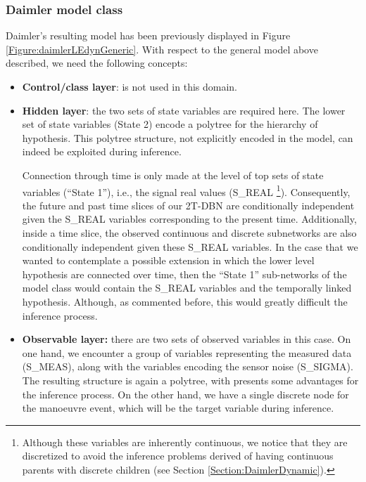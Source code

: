 
\subsubsection{Daimler model class}\label{daimlerAMIDSTModels}


Daimler's resulting model has been previously displayed in Figure \ref{Figure:daimlerLEdynGeneric}. With respect to the general model above described, we need the following concepts:

\begin{itemize}
\item \textbf{Control/class layer}: is not used in this domain.

\item \textbf{Hidden layer}: the two sets of state variables are required here. The lower set of state variables (State 2) encode a polytree \cite{JensenNielsen2007} for the hierarchy of hypothesis. This polytree structure, not explicitly encoded in the model, can indeed be exploited during inference.


Connection through time is only made at the level of top sets of state variables (``State 1''), i.e., the signal real values (S\_REAL \footnote{Although these variables are inherently continuous, we notice that they are discretized to avoid the inference problems derived of having continuous parents with discrete children (see Section \ref{Section:DaimlerDynamic}).}). Consequently, the future and past time slices of our 2T-DBN are conditionally independent given the S\_REAL variables corresponding to the present time. Additionally, inside a time slice, the observed continuous and discrete subnetworks are also conditionally independent given these S\_REAL variables. In the case that we wanted to contemplate a possible extension in which the lower level hypothesis are connected over time, then the ``State 1'' sub-networks of the model class would contain the S\_REAL variables and the temporally linked hypothesis. Although, as commented before, this would greatly difficult the inference process. 

\item \textbf{Observable layer:} there are two sets of observed variables in this case. On one hand, we encounter a group of variables representing the measured data (S\_MEAS), along with the variables encoding the sensor noise (S\_SIGMA). The resulting structure is again a polytree, with presents some advantages for the inference process. On the other hand, we have a single discrete node for the manoeuvre event, which will be the target variable during inference. 
\end{itemize}


